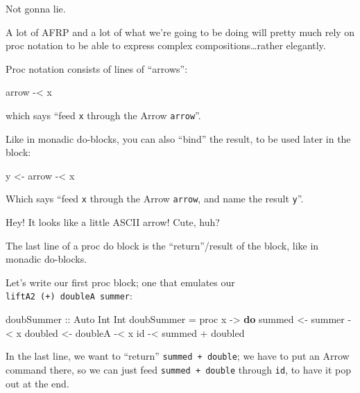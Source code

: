 \documentclass[]{article}
\newenvironment{Shaded}{}{}
\newcommand{\KeywordTok}[1]{\textcolor[rgb]{0.00,0.44,0.13}{\textbf{{#1}}}}
\newcommand{\DataTypeTok}[1]{\textcolor[rgb]{0.56,0.13,0.00}{{#1}}}
\newcommand{\OtherTok}[1]{\textcolor[rgb]{0.00,0.44,0.13}{{#1}}}
\newcommand{\FunctionTok}[1]{\textcolor[rgb]{0.02,0.16,0.49}{{#1}}}
\newcommand{\NormalTok}[1]{{#1}}
\begin{document}
Not gonna lie.

A lot of AFRP and a lot of what we're going to be doing will pretty much
rely on proc notation to be able to express complex
compositions\ldots{}rather elegantly.

Proc notation consists of lines of ``arrows'':

\begin{Shaded}
\begin{Highlighting}[]
\NormalTok{arrow }\FunctionTok{-<} \NormalTok{x}
\end{Highlighting}
\end{Shaded}

which says ``feed \texttt{x} through the Arrow \texttt{arrow}''.

Like in monadic do-blocks, you can also ``bind'' the result, to be used
later in the block:

\begin{Shaded}
\begin{Highlighting}[]
\NormalTok{y }\OtherTok{<-} \NormalTok{arrow }\FunctionTok{-<} \NormalTok{x}
\end{Highlighting}
\end{Shaded}

Which says ``feed \texttt{x} through the Arrow \texttt{arrow}, and name
the result \texttt{y}''.

Hey! It looks like a little ASCII arrow! Cute, huh?

The last line of a proc do block is the ``return''/result of the block,
like in monadic do-blocks.

Let's write our first proc block; one that emulates our
\texttt{liftA2\ (+)\ doubleA\ summer}:

\begin{Shaded}
\begin{Highlighting}[]
\OtherTok{doubSummer ::} \DataTypeTok{Auto} \DataTypeTok{Int} \DataTypeTok{Int}
\NormalTok{doubSummer }\FunctionTok{=} \NormalTok{proc x }\OtherTok{->} \KeywordTok{do}
    \NormalTok{summed  }\OtherTok{<-} \NormalTok{summer  }\FunctionTok{-<} \NormalTok{x}
    \NormalTok{doubled }\OtherTok{<-} \NormalTok{doubleA }\FunctionTok{-<} \NormalTok{x}
    \NormalTok{id }\FunctionTok{-<} \NormalTok{summed }\FunctionTok{+} \NormalTok{doubled}
\end{Highlighting}
\end{Shaded}

In the last line, we want to ``return'' \texttt{summed\ +\ double}; we
have to put an Arrow command there, so we can just feed
\texttt{summed\ +\ double} through \texttt{id}, to have it pop out at
the end.
\end{document}
